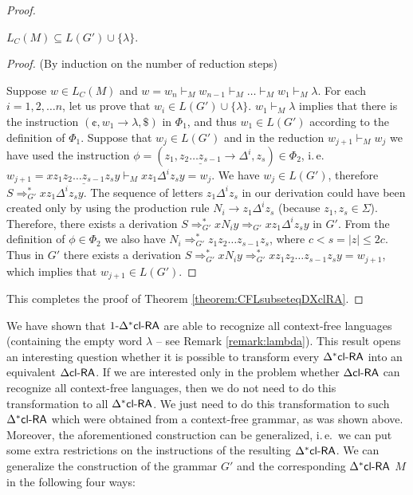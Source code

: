 \begin{proof}
\begin{lemma}\label{theorem:MsubseteqG}
$L_C(M) \subseteq L(G') \cup \{ \lambda \}$\;.
\end{lemma}

\begin{proof}
(By induction on the number of reduction steps)

Suppose $w \in L_C(M)$ and $w = w_n \vdash_M w_{n-1} \vdash_M \ldots \vdash_M w_1 \vdash_M \lambda$. For each $i = 1, 2, \ldots n$, let us prove that $w_i \in L(G') \cup \{ \lambda \}$. $w_1 \vdash_M \lambda$ implies that there is the instruction $(\cent, w_1 \to \lambda, \$)$  in $\Phi_1$, and thus $w_1 \in L(G')$ according to the definition of $\Phi_1$. Suppose that $w_j \in L(G')$ and in the reduction $w_{j+1} \vdash_M w_j$ we have used the instruction $\phi = (z_1, \underline{z_2 \ldots z_{s-1}} \to \Delta^i, z_s) \in \Phi_2$, i.\,e.\ $w_{j+1} = x z_1 \underline{z_2 \ldots z_{s-1}} z_s y \vdash_M x z_1 \Delta^i z_s y = w_j$. We have $w_j \in L(G')$, therefore $S \Rightarrow_{G'}^* x z_1 \Delta^i z_s y$. The sequence of letters $z_1 \Delta^i z_s$ in our derivation could have been created only by using the production rule $N_i \to z_1 \Delta^i z_s$ (because $z_1, z_s \in \Sigma$). Therefore, there exists a derivation $S \Rightarrow_{G'}^* x N_i y \Rightarrow_{G'} x z_1 \Delta^i z_s y$ in $G'$. From the definition of $\phi \in \Phi_2$ we also have $N_i \Rightarrow_{G'}^* z_1 z_2 \ldots z_{s-1} z_s$, where $c < s = |z| \le 2c$. Thus in $G'$ there exists a derivation $S \Rightarrow_{G'}^* x N_i y \Rightarrow_{G'}^* x z_1 z_2 \ldots z_{s-1} z_s y = w_{j+1}$, which implies that $w_{j+1} \in L(G')$.
\end{proof}

This completes the proof of Theorem \ref{theorem:CFLsubseteqDXclRA}.
\end{proof}

We have shown that $\kDXclRA[1]$ are able to recognize all context-free languages (containing the empty word $\lambda$ -- see Remark \ref{remark:lambda}). This result opens an interesting question whether it is possible to transform every $\DXclRA$ into an equivalent $\DclRA$. If we are interested only in the problem whether $\DclRA$ can recognize all context-free languages, then we do not need to do this transformation to all $\DXclRA$. We just need to do this transformation to such $\DXclRA$ which were obtained from a context-free grammar, as was shown above. Moreover, the aforementioned construction can be generalized, i.\,e.\ we can put some extra restrictions on the instructions of the resulting $\DXclRA$. We can generalize the construction of the grammar $G'$ and the corresponding $\DXclRA$ $M$ in the following four ways:

